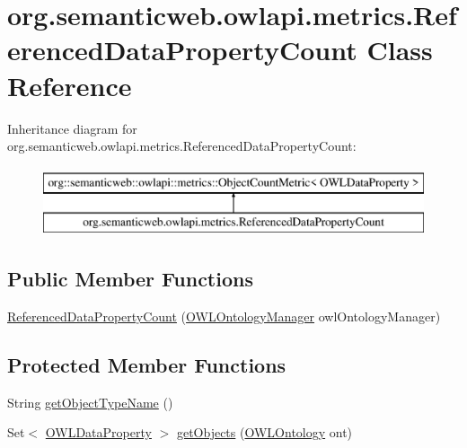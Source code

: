 \hypertarget{classorg_1_1semanticweb_1_1owlapi_1_1metrics_1_1_referenced_data_property_count}{\section{org.\-semanticweb.\-owlapi.\-metrics.\-Referenced\-Data\-Property\-Count Class Reference}
\label{classorg_1_1semanticweb_1_1owlapi_1_1metrics_1_1_referenced_data_property_count}
}
Inheritance diagram for org.\-semanticweb.\-owlapi.\-metrics.\-Referenced\-Data\-Property\-Count\-:\begin{figure}[H]
\begin{center}
\leavevmode
\includegraphics[height=2.000000cm]{classorg_1_1semanticweb_1_1owlapi_1_1metrics_1_1_referenced_data_property_count}
\end{center}
\end{figure}
\subsection*{Public Member Functions}
\begin{DoxyCompactItemize}
\item 
\hyperlink{classorg_1_1semanticweb_1_1owlapi_1_1metrics_1_1_referenced_data_property_count_ab3e176a847e6cd27873ea1c4d955884d}{Referenced\-Data\-Property\-Count} (\hyperlink{interfaceorg_1_1semanticweb_1_1owlapi_1_1model_1_1_o_w_l_ontology_manager}{O\-W\-L\-Ontology\-Manager} owl\-Ontology\-Manager)
\end{DoxyCompactItemize}
\subsection*{Protected Member Functions}
\begin{DoxyCompactItemize}
\item 
String \hyperlink{classorg_1_1semanticweb_1_1owlapi_1_1metrics_1_1_referenced_data_property_count_ae7f4172cc63f659af5bf78b631d26450}{get\-Object\-Type\-Name} ()
\item 
Set$<$ \hyperlink{interfaceorg_1_1semanticweb_1_1owlapi_1_1model_1_1_o_w_l_data_property}{O\-W\-L\-Data\-Property} $>$ \hyperlink{classorg_1_1semanticweb_1_1owlapi_1_1metrics_1_1_referenced_data_property_count_a7afe65f72a872a34a710a10dc6cf5736}{get\-Objects} (\hyperlink{interfaceorg_1_1semanticweb_1_1owlapi_1_1model_1_1_o_w_l_ontology}{O\-W\-L\-Ontology} ont)
\end{DoxyCompactItemize}


